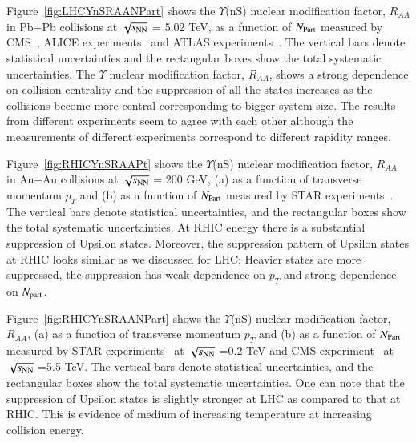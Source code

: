 Figure~\ref{fig:LHCYnSRAANPart} shows
the $\Upsilon$(nS) nuclear modification factor, $R_{AA}$
in Pb+Pb collisions at $\sqrt{s_{\rm NN}}$ = 5.02 TeV, as a function of $N_{\rm Part}$
measured by CMS~\cite{CMS:2018zza}, ALICE experiments~\cite{ALICE:2020wwx}
and ATLAS experiments~\cite{ALICE:2020wwx}.
 The vertical bars denote statistical uncertainties and the rectangular
boxes show the total systematic uncertainties. The $\Upsilon$ nuclear modification
factor, $R_{AA}$, shows a strong dependence on collision centrality and the
suppression of all the states increases as the collisions become more central
corresponding to bigger system size. The results from different experiments
seem to agree with each other although the measurements of different experiments
correspond to different rapidity ranges. 

    
Figure~\ref{fig:RHICYnSRAAPt} shows the $\Upsilon$(nS) nuclear modification factor, $R_{AA}$
in Au+Au collisions at $\sqrt{s_{\rm NN}}$ = 200 GeV,
 (a) as a function of transverse momentum $p_{T}$
and (b) as a function of $N_{\rm Part}$ measured by STAR
experiments~\cite{Wang:2019vau}. The vertical bars denote
statistical uncertainties, and the rectangular boxes show the total systematic
uncertainties. At RHIC energy there is a substantial suppression of Upsilon states.
Moreover, the suppression pattern of Upsilon states at RHIC 
looks similar as we discussed for LHC; Heavier states are more suppressed,
the suppression has weak dependence on $p_T$ and strong dependence on $N_{\rm part}$.



Figure~\ref{fig:RHICYnSRAANPart} shows
  the $\Upsilon$(nS) nuclear modification factor, $R_{AA}$, (a) as a function of transverse momentum $p_{T}$
  and (b) as a function of $N_{\rm Part}$ measured by STAR experiments~\cite{Wang:2019vau} at $\sqrt{s_{\rm NN}}$ =0.2 TeV and
  CMS experiment~\cite{CMS:2018zza} at $\sqrt{s_{\rm NN}}$ =5.5 TeV.
The vertical bars denote statistical uncertainties, and the
rectangular boxes show the total systematic uncertainties.
One can note that the suppression of Upsilon states is slightly stronger at
LHC as compared to that at RHIC. This is evidence of medium of increasing
temperature at increasing collision energy.


